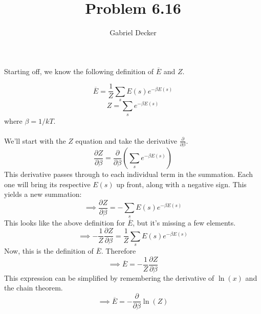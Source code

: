 \documentclass[12pt]{article}
\title{Problem 6.16}
\author{Gabriel Decker}
\newcommand{\partDeriv}[2]{\frac{\partial #1}{\partial #2}}
\begin{document}
\maketitle
\begin{flushleft}

Starting off, we know the following definition of $\overline{E}$ and $Z$.

\begin{equation}
    \overline{E}=\frac{1}{Z}\sum_sE(s)e^{-\beta E(s)}
\end{equation}
\begin{equation}
    Z=\sum_se^{-\beta E(s)}
\end{equation}
where $\beta=1/kT$.\\~\\

We'll start with the $Z$ equation and take the derivative $\partDeriv{}{\beta}$.
$$\partDeriv{Z}{\beta}=\partDeriv{}{\beta}\left(\sum_se^{-\beta E(s)}\right)$$
This derivative passes through to each individual term in the summation. Each one will bring its respective $E(s)$ up front, along with a negative sign. This yields a new summation:
$$\implies\partDeriv{Z}{\beta}=-\sum_sE(s)e^{-\beta E(s)}$$
This looks like the above definition for $\overline{E}$, but it's missing a few elements.
$$\implies-\frac{1}{Z}\partDeriv{Z}{\beta}=\frac{1}{Z}\sum_sE(s)e^{-\beta E(s)}$$
Now, this is the definition of $\overline{E}$. Therefore
$$\implies\overline{E}=-\frac{1}{Z}\partDeriv{Z}{\beta}$$
This expression can be simplified by remembering the derivative of $\ln(x)$ and the chain theorem.
$$\implies\overline{E}=-\partDeriv{}{\beta}\ln(Z)$$



\end{flushleft}
\end{document}
